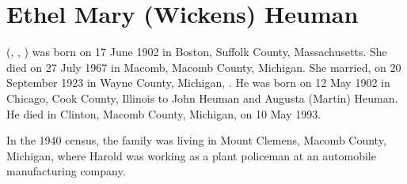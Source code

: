 \section{Ethel Mary (Wickens) Heuman}\label{per:Ethel4Wickens}

 (, , ) was born on 17 June 1902 in Boston, Suffolk County, Massachusetts.\cite{Ethel4WickensBirth} She died on 27 July 1967 in Macomb, Macomb County, Michigan.\cite{Ethel4WickensDeath} She married, on 20 September 1923 in Wayne County, Michigan, .\cite{Ethel4WickensMarriage} He was born on 12 May 1902 in Chicago, Cook County, Illinois\cite{HaroldHeumanDeath:1} to John Heuman and Augusta (Martin) Heuman.\cite{Census1910HaroldHeuman} He died in Clinton, Macomb County, Michigan, on 10 May 1993.\cite{HaroldHeumanDeath:2}

In the 1940 census, the family was living in Mount Clemens, Macomb County, Michigan, where Harold was working as a plant policeman at an automobile manufacturing company.\cite{Census1940HaroldHeuman}

